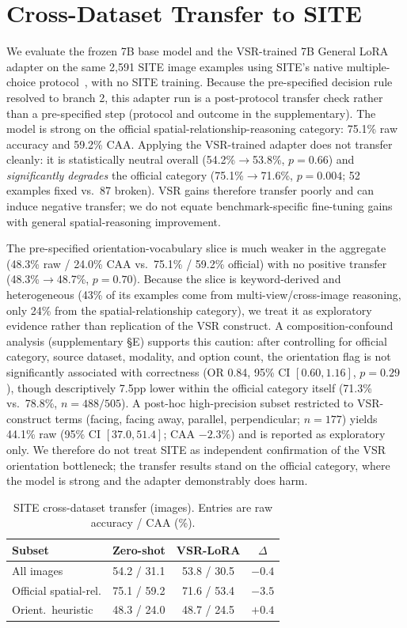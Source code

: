 \documentclass[10pt,twocolumn,letterpaper]{article}
\begin{document}
\section{Cross-Dataset Transfer to SITE}
\label{sec:site}
We evaluate the frozen 7B base model and the VSR-trained 7B General LoRA adapter on the same 2,591 SITE image examples using SITE's native multiple-choice protocol~\cite{wang2025site}, with no SITE training. Because the pre-specified decision rule resolved to branch 2, this adapter run is a post-protocol transfer check rather than a pre-specified step (protocol and outcome in the supplementary). The model is strong on the official spatial-relationship-reasoning category: 75.1\% raw accuracy and 59.2\% CAA. Applying the VSR-trained adapter does not transfer cleanly: it is statistically neutral overall (54.2\%$\rightarrow$53.8\%, $p=0.66$) and \emph{significantly degrades} the official category (75.1\%$\rightarrow$71.6\%, $p=0.004$; 52 examples fixed vs.\ 87 broken). VSR gains therefore transfer poorly and can induce negative transfer; we do not equate benchmark-specific fine-tuning gains with general spatial-reasoning improvement.

The pre-specified orientation-vocabulary slice is much weaker in the aggregate (48.3\% raw / 24.0\% CAA vs.\ 75.1\% / 59.2\% official) with no positive transfer (48.3\%$\rightarrow$48.7\%, $p=0.70$). Because the slice is keyword-derived and heterogeneous (43\% of its examples come from multi-view/cross-image reasoning, only 24\% from the spatial-relationship category), we treat it as exploratory evidence rather than replication of the VSR construct. A composition-confound analysis (supplementary \S E) supports this caution: after controlling for official category, source dataset, modality, and option count, the orientation flag is not significantly associated with correctness (OR 0.84, 95\% CI $[0.60, 1.16]$, $p=0.29$), though descriptively 7.5pp lower within the official category itself (71.3\% vs.\ 78.8\%, $n{=}488/505$). A post-hoc high-precision subset restricted to VSR-construct terms (facing, facing away, parallel, perpendicular; $n{=}177$) yields 44.1\% raw (95\% CI $[37.0, 51.4]$; CAA $-2.3\%$) and is reported as exploratory only. We therefore do not treat SITE as independent confirmation of the VSR orientation bottleneck; the transfer results stand on the official category, where the model is strong and the adapter demonstrably does harm.

\begin{table}[t]
\centering
\footnotesize
\setlength{\tabcolsep}{4pt}
\caption{SITE cross-dataset transfer (images). Entries are raw accuracy / CAA (\%).}
\label{tab:site}
\begin{tabular}{lccc}
\toprule
Subset & Zero-shot & VSR-LoRA & $\Delta$ \\
\midrule
All images & 54.2 / 31.1 & 53.8 / 30.5 & $-0.4$ \\
Official spatial-rel. & 75.1 / 59.2 & 71.6 / 53.4 & $-3.5$ \\
Orient.\ heuristic & 48.3 / 24.0 & 48.7 / 24.5 & $+0.4$ \\
\bottomrule
\end{tabular}
\end{table}
\end{document}
